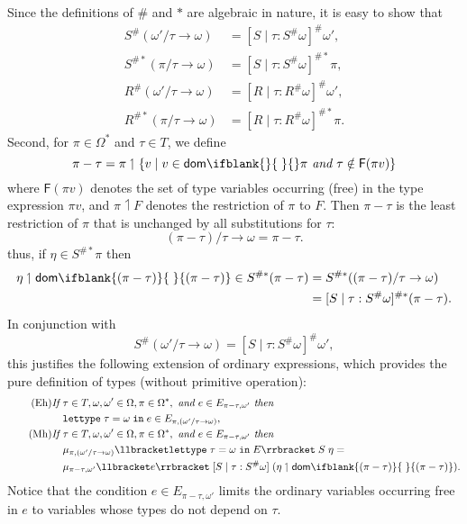 \documentclass[sigplan,screen,nonacm,balance=false]{acmart}
\theoremstyle{plain}
\DeclarePairedDelimiter{\set}{\{}{\}}
\DeclarePairedDelimiter{\interp}{\llbracket}{\rrbracket}
\newcommand{\lettypein}[3]{\mathtt{lettype} \; #1 = #2 \; \mathtt{in} \; #3}
\newcommand{\dom}[1]{\mathsf{dom}\ifblank{#1}{\;}{#1}}
\newcommand{\FV}{\mathsf{F}}
\begin{document}
Since the definitions of $\#$ and $*$ are algebraic in nature, it is easy to show that
%
\begin{align*}
  S^\#(\omega'/\tau \to \omega) &= [S \mid \tau : S^\# \omega]^\# \omega', \\
  S^{\#*}(\pi/\tau \to \omega) &= [S \mid \tau : S^\# \omega]^{\#*} \pi, \\
  R^\#(\omega'/\tau \to \omega) &= [R \mid \tau : R^\# \omega]^\# \omega', \\
  R^{\#*}(\pi/\tau \to \omega) &= [R \mid \tau : R^\# \omega]^{\#*} \pi.
\end{align*}
%
Second, for $\pi \in \Omega^*$ and $\tau \in T$, we define
%
\begin{equation*}
  \pi - \tau = \pi \upharpoonleft \set{v \mid v \in \dom{} \pi \textit{ and } \tau \notin \FV(\pi v)}
\end{equation*}
%
where $\FV(\pi v)$ denotes the set of type variables occurring (free) in the type expression $\pi v$, and $\pi \upharpoonleft F$ denotes the restriction of $\pi$ to $F$.
Then $\pi - \tau$ is the least restriction of $\pi$ that is unchanged by all substitutions for $\tau$:
%
\begin{equation*}
  (\pi - \tau)/\tau \to \omega = \pi - \tau.
\end{equation*}
%
thus, if $\eta \in S^{\#*} \pi$ then
%
\begin{align*}
  \eta \upharpoonleft \dom{(\pi - \tau)} \in S^{\#*}(\pi - \tau) &= S^{\#*}((\pi - \tau)/\tau \to \omega) \\
  &= [S \mid \tau : S^\# \omega]^{\#*} (\pi - \tau).
\end{align*}
%
In conjunction with
%
\begin{equation*}
  S^\#(\omega'/\tau \to \omega) = [S \mid \tau : S^\# \omega]^\# \omega',
\end{equation*}
%
this justifies the following extension of ordinary expressions, which provides the pure definition of types (without primitive operation):
%
\begin{align}
  \tag{Eh}
  \textit{If } & \tau \in T, \omega, \omega' \in \Omega, \pi \in \Omega^*, \textit{ and } e \in E_{\pi - \tau, \omega'} \textit{ then } \\
  \nonumber
  & \lettypein{\tau}{\omega}{e} \in E_{\pi, (\omega'/\tau \to \omega)}, \\
  \tag{Mh}
  \textit{If } & \tau \in T, \omega, \omega' \in \Omega, \pi \in \Omega^*, \textit{ and } e \in E_{\pi - \tau, \omega'} \textit{ then } \\
  \nonumber
  & \mu_{\pi, (\omega'/\tau \to \omega)} \interp{\lettypein{\tau}{\omega}{E}} \; S \; \eta = \\
  \nonumber
  & \mu_{\pi - \tau, \omega'} \interp{e} \; [S \mid \tau : S^\# \omega] \; (\eta \upharpoonleft \dom{(\pi - \tau)}).
\end{align}
%
Notice that the condition $e \in E_{\pi - \tau, \omega'}$ limits the ordinary variables occurring free in $e$ to variables whose types do not depend on $\tau$.
\end{document}
